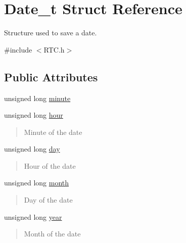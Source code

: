 \hypertarget{struct_date__t}{}\section{Date\+\_\+t Struct Reference}
\label{struct_date__t}


Structure used to save a date.  




{\ttfamily \#include $<$R\+T\+C.\+h$>$}

\subsection*{Public Attributes}
\begin{DoxyCompactItemize}
\item 
unsigned long \hyperlink{struct_date__t_a6229b5d29374950a2304217dda206f3e}{minute}
\item 
unsigned long \hyperlink{struct_date__t_a7fee0e3c9e76065caa6bf859e3a351ea}{hour}
\begin{DoxyCompactList}\small\item\em \begin{quote}
Minute of the date \end{quote}
\end{DoxyCompactList}\item 
unsigned long \hyperlink{struct_date__t_a270823800a62aa498b9555c99769a3b5}{day}
\begin{DoxyCompactList}\small\item\em \begin{quote}
Hour of the date \end{quote}
\end{DoxyCompactList}\item 
unsigned long \hyperlink{struct_date__t_a2ee23f8b842ac810439f48929dc02d0a}{month}
\begin{DoxyCompactList}\small\item\em \begin{quote}
Day of the date \end{quote}
\end{DoxyCompactList}\item 
unsigned long \hyperlink{struct_date__t_af593228c5b6e2316a755c061bbea3d34}{year}
\begin{DoxyCompactList}\small\item\em \begin{quote}
Month of the date \end{quote}
\end{DoxyCompactList}\end{DoxyCompactItemize}


